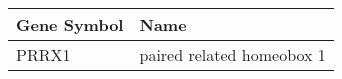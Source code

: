 \begin{tabular}{ll}
\toprule
Gene Symbol &                      Name \\
\midrule
      PRRX1 & paired related homeobox 1 \\
\bottomrule
\end{tabular}
